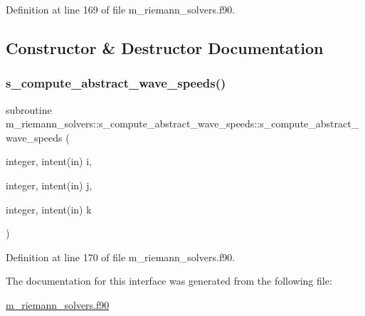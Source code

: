Definition at line 169 of file m\+\_\+riemann\+\_\+solvers.\+f90.



\subsection{Constructor \& Destructor Documentation}
\mbox{\label{interfacem__riemann__solvers_1_1s__compute__abstract__wave__speeds_ad7f89b16e5768c11fcaf1c4b4d9a24b3}} 
\subsubsection{\texorpdfstring{s\+\_\+compute\+\_\+abstract\+\_\+wave\+\_\+speeds()}{s\_compute\_abstract\_wave\_speeds()}}
{\footnotesize\ttfamily subroutine m\+\_\+riemann\+\_\+solvers\+::s\+\_\+compute\+\_\+abstract\+\_\+wave\+\_\+speeds\+::s\+\_\+compute\+\_\+abstract\+\_\+wave\+\_\+speeds (\begin{DoxyParamCaption}\item[{integer, intent(in)}]{i,  }\item[{integer, intent(in)}]{j,  }\item[{integer, intent(in)}]{k }\end{DoxyParamCaption})}



Definition at line 170 of file m\+\_\+riemann\+\_\+solvers.\+f90.



The documentation for this interface was generated from the following file\+:\begin{DoxyCompactItemize}
\item 
\hyperlink{m__riemann__solvers_8f90}{m\+\_\+riemann\+\_\+solvers.\+f90}\end{DoxyCompactItemize}
